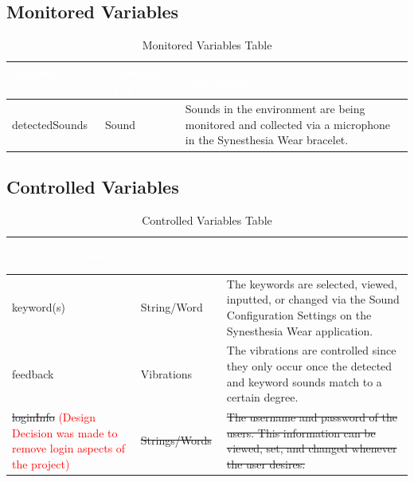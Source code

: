\documentclass[12pt, titlepage]{article}
\begin{document}
\subsection{Monitored Variables}
\begin{table}[H]
  \centering
  \caption{Monitored Variables Table}
  \label{table:MonitoredVar Table} 
  \begin{tabular}{|p{5cm}|p{5cm}|p{5cm}|} 
  \hline
  \rowcolor[rgb]{0.071,0.49,0.698} \textcolor{white}{Monitored Name} & \textcolor{white}{Monitored Type} & \textcolor{white}{Description}                                          \\ 
  \hline
  \rowcolor[rgb]{0.675,0.827,0.902}   detectedSounds      & Sound &  Sounds in the environment are being monitored and collected via a microphone in the Synesthesia Wear bracelet. \\
  \hline
  \end{tabular}
\end{table}

\subsection{Controlled Variables}
\begin{table}[H]
  \centering
  \caption{Controlled Variables Table}
  \label{table:ControlledVar Table} 
  \begin{tabular}{|p{5cm}|p{5cm}|p{5cm}|} 
  \hline
  \rowcolor[rgb]{0.071,0.49,0.698} \textcolor{white}{Controlled Name} & \textcolor{white}{Controlled Type} & \textcolor{white}{Description}                                          \\ 
  \hline
  \rowcolor[rgb]{0.675,0.827,0.902}    keyword(s)     & String/Word &  The keywords are selected, viewed, inputted, or changed via the Sound Configuration Settings on the Synesthesia Wear application. \\
  \hline
  \rowcolor[rgb]{0.675,0.827,0.902}    feedback    &  Vibrations    &  The vibrations are controlled since they only occur once the detected and keyword sounds match to a certain degree.           \\
  \hline
  \rowcolor[rgb]{0.675,0.827,0.902}    \sout{loginInfo} \textcolor{red}{(Design Decision was made to remove login aspects of the project)}    &  \sout{Strings/Words}    &  \sout{The username and password of the users. This information can be viewed, set, and changed whenever the user desires.}           \\
  \hline
  \end{tabular}
\end{table}
\end{document}

